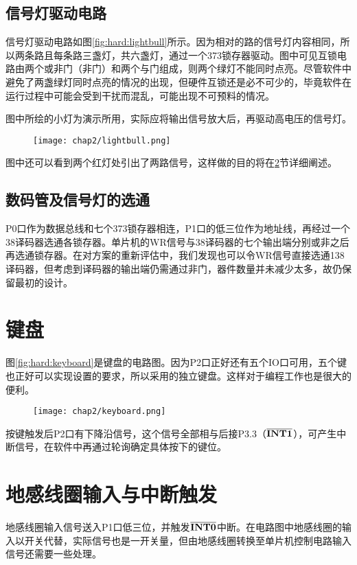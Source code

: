 	\subsection{信号灯驱动电路} \label{sec:hard:lightbull}
	信号灯驱动电路如图\ref{fig:hard:lightbull}所示。因为相对的路的信号灯内容相同，所以两条路且每条路三盏灯，共六盏灯，通过一个373锁存器驱动。图中可见互锁电路由两个或非门（非门）和两个与门组成，则两个绿灯不能同时点亮。尽管软件中避免了两盏绿灯同时点亮的情况的出现，但硬件互锁还是必不可少的，毕竟软件在运行过程中可能会受到干扰而混乱，可能出现不可预料的情况。
	
	图中所绘的小灯为演示所用，实际应将输出信号放大后，再驱动高电压的信号灯。
	\begin{figure}[!tbh]
	\centering
	\texttt{[image: chap2/lightbull.png]}
	\end{figure}
	
	图中还可以看到两个红灯处引出了两路信号，这样做的目的将在\ref{sec:hard:int0}节详细阐述。
	
	\subsection{数码管及信号灯的选通}
	P0口作为数据总线和七个373锁存器相连，P1口的低三位作为地址线，再经过一个38译码器选通各锁存器。单片机的WR信号与38译码器的七个输出端分别或非之后再选通锁存器。在对方案的重新评估中，我们发现也可以令WR信号直接选通138译码器，但考虑到译码器的输出端仍需通过非门，器件数量并未减少太多，故仍保留最初的设计。

\section{键盘}
	图\ref{fig:hard:keyboard}是键盘的电路图。因为P2口正好还有五个IO口可用，五个键也正好可以实现设置的要求，所以采用的独立键盘。这样对于编程工作也是很大的便利。
	\begin{figure}[!tbh]
	\centering
	\texttt{[image: chap2/keyboard.png]}
	\end{figure}
	
	按键触发后P2口有下降沿信号，这个信号全部相与后接P3.3（$\bf \overline{INT1}$），可产生中断信号，在软件中再通过轮询确定具体按下的键位。
	
\section{地感线圈输入与中断触发} \label{sec:hard:int0}
	地感线圈输入信号送入P1口低三位，并触发$\bf \overline{INT0}$中断。在电路图中地感线圈的输入以开关代替，实际信号也是一开关量，但由地感线圈转换至单片机控制电路输入信号还需要一些处理。
	
